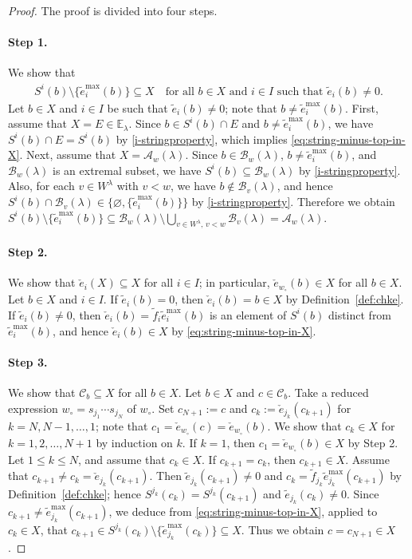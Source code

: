 \documentclass[reqno]{amsart}
\theoremstyle{definition}
\theoremstyle{remark}
\numberwithin{equation}{section}
\newcommand{\B}{\mathcal{B}}
\newcommand{\wo}{w_\circ}
\newcommand{\te}{\tilde e}
\newcommand{\tf}{\tilde f}
\newcommand{\chke}{\check e}
\begin{document}
	\begin{proof}
		The proof is divided into four steps.
		\paragraph{\bf Step 1.}
		We show that
		\begin{align}\label{eq:string-minus-top-in-X}
			S^i(b)\setminus\{\te_i^{\max}(b)\}\subseteq X
			\quad\text{for all } b\in X \text{ and } i\in I \text{ such that } \te_i(b)\ne0.
		\end{align}
		Let $b\in X$ and $i\in I$ be such that $\te_i(b)\ne0$; note that $b\ne\te_i^{\max}(b)$.
		First, assume that $X=E\in\mathbb{E}_\lambda$.
		Since $b\in S^i(b)\cap E$ and $b\ne\te_i^{\max}(b)$,
		we have $S^i(b)\cap E=S^i(b)$ by \eqref{i-stringproperty}, which implies \eqref{eq:string-minus-top-in-X}.
		Next, assume that $X=\mathcal{A}_w(\lambda)$.
		Since $b\in\B_w(\lambda)$, $b\ne\te_i^{\max}(b)$, and $\B_w(\lambda)$ is an extremal subset,
		we have $S^i(b)\subseteq\B_w(\lambda)$ by \eqref{i-stringproperty}.
		Also, for each $v\in W^\lambda$ with $v<w$, we have $b\notin\B_v(\lambda)$,
		and hence $S^i(b)\cap\B_v(\lambda)\in\{\varnothing,\{\te_i^{\max}(b)\}\}$ by \eqref{i-stringproperty}.
		Therefore we obtain
		$S^i(b)\setminus\{\te_i^{\max}(b)\}\subseteq\B_w(\lambda)\setminus\bigcup_{v\in W^\lambda,\,v<w}\B_v(\lambda)=\mathcal{A}_w(\lambda)$.
		
		\paragraph{\bf Step 2.}
		We show that $\chke_i(X)\subseteq X$ for all $i\in I$;
		in particular, $\chke_{\wo}(b)\in X$ for all $b\in X$.
		Let $b\in X$ and $i\in I$.
		If $\te_i(b)=0$, then $\chke_i(b)=b\in X$ by Definition~\ref{def:chke}.
		If $\te_i(b)\ne0$, then $\chke_i(b)=\tf_i\te_i^{\max}(b)$ is an element of $S^i(b)$ distinct from $\te_i^{\max}(b)$,
		and hence $\chke_i(b)\in X$ by \eqref{eq:string-minus-top-in-X}.
		
		\paragraph{\bf Step 3.}
		We show that $\mathcal{C}_b\subseteq X$ for all $b\in X$.
		Let $b\in X$ and $c\in\mathcal{C}_b$.
		Take a reduced expression $\wo=s_{j_1}\cdots s_{j_N}$ of $\wo$.
		Set $c_{N+1}:=c$ and $c_k:=\chke_{j_k}(c_{k+1})$ for $k=N,N-1,\dots,1$;
		note that $c_1=\chke_{\wo}(c)=\chke_{\wo}(b)$.
		We show that $c_k\in X$ for $k=1,2,\dots,N+1$ by induction on $k$.
		If $k=1$, then $c_1=\chke_{\wo}(b)\in X$ by Step 2.
		Let $1\le k\le N$, and assume that $c_k\in X$.
		If $c_{k+1}=c_k$, then $c_{k+1}\in X$.
		Assume that $c_{k+1}\ne c_k=\chke_{j_k}(c_{k+1})$.
		Then $\te_{j_k}(c_{k+1})\ne0$ and $c_k=\tf_{j_k}\te_{j_k}^{\max}(c_{k+1})$ by Definition~\ref{def:chke};
		hence $S^{j_k}(c_k)=S^{j_k}(c_{k+1})$ and $\te_{j_k}(c_k)\ne0$.
		Since $c_{k+1}\ne\te_{j_k}^{\max}(c_{k+1})$,
		we deduce from \eqref{eq:string-minus-top-in-X}, applied to $c_k\in X$, that
		$c_{k+1}\in S^{j_k}(c_k)\setminus\{\te_{j_k}^{\max}(c_k)\}\subseteq X$.
		Thus we obtain $c=c_{N+1}\in X$.
		

\end{proof}
\end{document}

